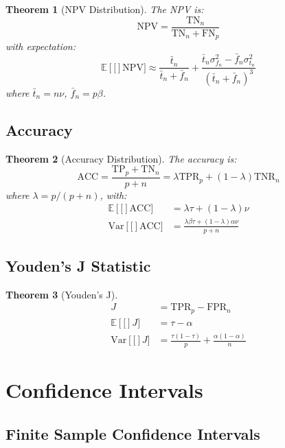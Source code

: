 \documentclass[11pt,final,hidelinks]{article}
\newtheorem{theorem}{Theorem}[section]
\newcommand{\fprate}{\alpha}
\newcommand{\fnrate}{\beta}
\newcommand{\tprate}{\tau}
\newcommand{\tnrate}{\nu}
\newcommand{\Expect}[1]{\mathbb{E}\left[#1\right]}
\newcommand{\Var}[1]{\text{Var}\left[#1\right]}
\newcommand{\TP}{\text{TP}}
\newcommand{\TN}{\text{TN}}
\newcommand{\FN}{\text{FN}}
\newcommand{\TPR}{\text{TPR}}
\newcommand{\FPR}{\text{FPR}}
\newcommand{\TNR}{\text{TNR}}
\newcommand{\NPV}{\text{NPV}}
\newcommand{\ACC}{\text{ACC}}
\begin{document}
\begin{theorem}[NPV Distribution]
The NPV is:
\begin{equation}
\NPV = \frac{\TN_n}{\TN_n + \FN_p}
\end{equation}
with expectation:
\begin{equation}
\Expect[\NPV] \approx \frac{\bar{t}_n}{\bar{t}_n + \bar{f}_n} + \frac{\bar{t}_n \sigma^2_{f_n} - \bar{f}_n \sigma^2_{t_n}}{(\bar{t}_n + \bar{f}_n)^3}
\end{equation}
where $\bar{t}_n = n\tnrate$, $\bar{f}_n = p\fnrate$.
\end{theorem}

\subsection{Accuracy}

\begin{theorem}[Accuracy Distribution]
The accuracy is:
\begin{equation}
\ACC = \frac{\TP_p + \TN_n}{p + n} = \lambda \TPR_p + (1-\lambda) \TNR_n
\end{equation}
where $\lambda = p/(p+n)$, with:
\begin{align}
\Expect[\ACC] &= \lambda\tprate + (1-\lambda)\tnrate \\
\Var[\ACC] &= \frac{\lambda\fnrate\tprate + (1-\lambda)\fprate\tnrate}{p+n}
\end{align}
\end{theorem}

\subsection{Youden's J Statistic}

\begin{theorem}[Youden's J]
\begin{align}
J &= \TPR_p - \FPR_n \\
\Expect[J] &= \tprate - \fprate \\
\Var[J] &= \frac{\tprate(1-\tprate)}{p} + \frac{\fprate(1-\fprate)}{n}
\end{align}
\end{theorem}

\section{Confidence Intervals}

\subsection{Finite Sample Confidence Intervals}
\end{document}
